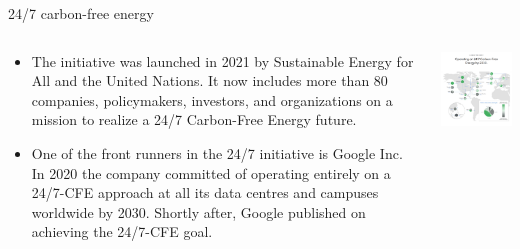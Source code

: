 \begin{frame}{24/7 carbon-free energy}
  
  \begin{columns}[T]
  \begin{column}{8cm}

    \begin{itemize}
    \item The  
    initiative was launched in 2021 by Sustainable Energy for All and the United Nations. 
    It now includes more than 80 companies, policymakers, investors, and organizations 
    on a mission to realize a 24/7 Carbon-Free Energy future. 

    \item One of the front runners in the 24/7 initiative is Google Inc. In 2020 the company committed 
    of operating entirely on a 24/7-CFE approach at all its data centres and campuses worldwide by 2030. 
    Shortly after, Google published 
    on achieving the 24/7-CFE goal.

    \end{itemize}
  \end{column}

  \begin{column}{8cm}
    \centering
    \includegraphics[width=7.5cm]{images/247-google-web.png}
    \vspace{.1cm}
  \end{column}

  \end{columns}
  
\end{frame}



